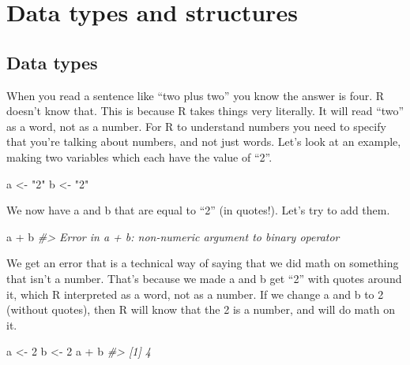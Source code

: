 \documentclass[
]{krantz}
\makeatletter
\newenvironment{Shaded}{\begin{snugshade}}{\end{snugshade}}
\newcommand{\CommentTok}[1]{\textcolor[rgb]{0.37,0.37,0.37}{\textit{#1}}}
\newcommand{\DecValTok}[1]{\textcolor[rgb]{0.06,0.06,0.06}{#1}}
\newcommand{\NormalTok}[1]{#1}
\newcommand{\OtherTok}[1]{\textcolor[rgb]{0.37,0.37,0.37}{#1}}
\newcommand{\SpecialCharTok}[1]{\textcolor[rgb]{0,0,0}{#1}}
\newcommand{\StringTok}[1]{\textcolor[rgb]{0.5,0.5,0.5}{#1}}
\newenvironment{kframe}{%
\medskip{}
\setlength{\fboxsep}{.8em}
 \def\at@end@of@kframe{}%
 \ifinner\ifhmode%
  \def\at@end@of@kframe{\end{minipage}}%
  \begin{minipage}{\columnwidth}%
 \fi\fi%
 \def\FrameCommand##1{\hskip\@totalleftmargin \hskip-\fboxsep
 \colorbox{shadecolor}{##1}\hskip-\fboxsep
     \hskip-\linewidth \hskip-\@totalleftmargin \hskip\columnwidth}%
 \MakeFramed {\advance\hsize-\width
   \@totalleftmargin\z@ \linewidth\hsize
   \@setminipage}}%
 {\par\unskip\endMakeFramed%
 \at@end@of@kframe}
\renewenvironment{Shaded}{\begin{kframe}}{\end{kframe}}
\makeatother
\begin{document}
\hypertarget{data-types}{%
\chapter{Data types and structures}\label{data-types}}

\hypertarget{section-data-types}{%
\section{Data types}\label{section-data-types}}

When you read a sentence like ``two plus two'' you know the answer is four. R doesn't know that. This is because R takes things very literally. It will read ``two'' as a word, not as a number. For R to understand numbers you need to specify that you're talking about numbers, and not just words. Let's look at an example, making two variables which each have the value of ``2''.

\begin{Shaded}
\begin{Highlighting}[]
\NormalTok{a }\OtherTok{\textless{}{-}} \StringTok{"2"}
\NormalTok{b }\OtherTok{\textless{}{-}} \StringTok{"2"}
\end{Highlighting}
\end{Shaded}

We now have a and b that are equal to ``2'' (in quotes!). Let's try to add them.

\begin{Shaded}
\begin{Highlighting}[]
\NormalTok{a }\SpecialCharTok{+}\NormalTok{ b}
\CommentTok{\#\textgreater{} Error in a + b: non{-}numeric argument to binary operator}
\end{Highlighting}
\end{Shaded}

We get an error that is a technical way of saying that we did math on something that isn't a number. That's because we made a and b get ``2'' with quotes around it, which R interpreted as a word, not as a number. If we change a and b to 2 (without quotes), then R will know that the 2 is a number, and will do math on it.

\begin{Shaded}
\begin{Highlighting}[]
\NormalTok{a }\OtherTok{\textless{}{-}} \DecValTok{2}
\NormalTok{b }\OtherTok{\textless{}{-}} \DecValTok{2}
\NormalTok{a }\SpecialCharTok{+}\NormalTok{ b}
\CommentTok{\#\textgreater{} [1] 4}
\end{Highlighting}
\end{Shaded}
\end{document}
